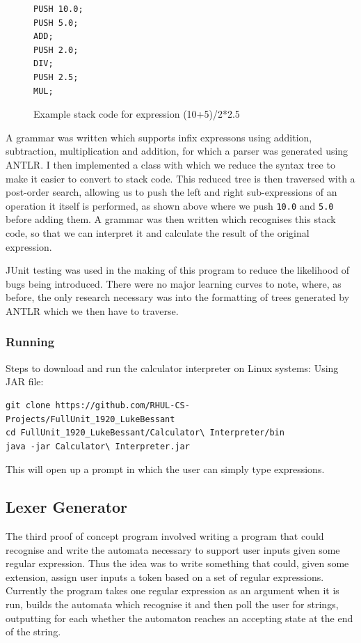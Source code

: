 \documentclass[a4paper, 11pt]{article}
\begin{document}
\begin{figure}[H]
\centering
\begin{BVerbatim}
PUSH 10.0;
PUSH 5.0;
ADD;
PUSH 2.0;
DIV;
PUSH 2.5;
MUL;
\end{BVerbatim}
\caption{Example stack code for expression (10+5)/2*2.5}
\end{figure}

\noindent A grammar was written which supports infix expressons using addition, subtraction, multiplication and addition, for which a parser was generated using ANTLR. I then implemented a class with which we reduce the syntax tree to make it easier to convert to stack code. This reduced tree is then traversed with a post-order search, allowing us to push the left and right sub-expressions of an operation it itself is performed, as shown above where we push \texttt{10.0} and \texttt{5.0} before adding them. A grammar was then written which recognises this stack code, so that we can interpret it and calculate the result of the original expression. 

JUnit testing was used in the making of this program to reduce the likelihood of bugs being introduced. There were no major learning curves to note, where, as before, the only research necessary was into the formatting of trees generated by ANTLR which we then have to traverse. 
\subsubsection{Running}
Steps to download and run the calculator interpreter on Linux systems: Using JAR file:
\begin{verbatim}
git clone https://github.com/RHUL-CS-Projects/FullUnit_1920_LukeBessant
cd FullUnit_1920_LukeBessant/Calculator\ Interpreter/bin
java -jar Calculator\ Interpreter.jar
\end{verbatim}
This will open up a prompt in which the user can simply type expressions.

\subsection{Lexer Generator}
The third proof of concept program involved writing a program that could recognise and write the automata necessary to support user inputs given some regular expression. Thus the idea was to write something that could, given some extension, assign user inputs a token based on a set of regular expressions. Currently the program takes one regular expression as an argument when it is run, builds the automata which recognise it and then poll the user for strings, outputting for each whether the automaton reaches an accepting state at the end of the string.
\end{document}

